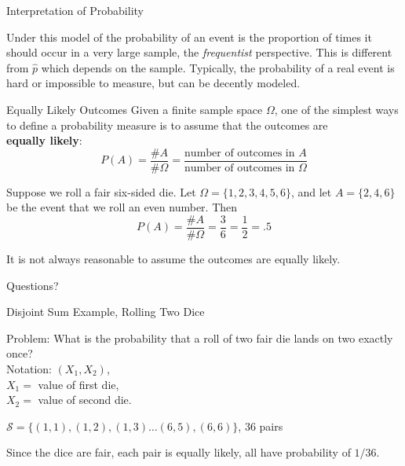 \documentclass{beamer}
\newcommand{\qtns}[0]{\begin{center} Questions? \end{center}}
\newcommand{\nl}[1]{\vspace{#1 em}}
\begin{document}
\begin{frame}{Interpretation of Probability}

    Under this model of the probability of an event is the proportion of times it should occur in a very large sample, the \textit{frequentist} perspective. This is different from $\hat{p}$ which depends on the sample. Typically, the probability of a real event is hard or impossible to measure, but can be decently modeled.
\end{frame}

\begin{frame}{Equally Likely Outcomes}
    Given a finite sample space $\Omega$, one of the simplest ways to define a probability measure is to assume that the outcomes are \\{\bf equally likely}:
    $$P(A) = \frac{\# A}{\# \Omega} = \frac{\text{number of outcomes in $A$}}{\text{number of outcomes in $\Omega$}}$$
    
    \begin{example}
    Suppose we roll a fair six-sided die. Let $\Omega=\{1,2,3,4,5,6\}$, and let $A=\{2,4,6\}$ be the event that we roll an even number. Then
    $$P(A)=\frac{\# A}{\#\Omega}=\frac36=\frac12=.5$$
    \end{example}
    It is not always reasonable to assume the outcomes are equally likely. %
    \qtns
    \end{frame}

    \begin{frame}{Disjoint Sum Example, Rolling Two Dice}
        
        Problem: What is the probability that a roll of two fair die lands on two exactly once?\\
        \nl{0.5}
        Notation: $(X_1,X_2)$, \\
        $X_1 =$ value of first die, \\$X_2 =$ value of second die.\\
        \nl{0.5}
        \begin{center}
        $\mathcal{S} = \{(1,1), (1,2), (1,3) \ldots (6,5), (6,6)\}$, 36 pairs
        \end{center}
        Since the dice are fair, each pair is equally likely, all have probability of $1/36$.
    \end{frame}
\end{document}

